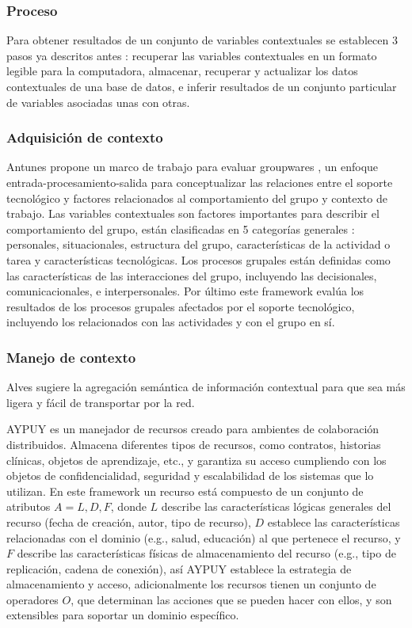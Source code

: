 \subsubsection{Proceso}
Para obtener resultados de un conjunto de variables contextuales se establecen 3 pasos ya descritos antes \cite{montane2013context}: recuperar las variables contextuales en un formato legible para la computadora, almacenar, recuperar y actualizar los datos contextuales de una base de datos, e inferir resultados de un conjunto particular de variables asociadas unas con otras.

\subsubsection {Adquisici\'on de contexto}
 Antunes propone un marco de trabajo para evaluar groupwares \cite{antunes2008structuring}, un enfoque entrada-procesamiento-salida para conceptualizar las relaciones entre el soporte tecnol\'ogico y factores relacionados al comportamiento del grupo y contexto de trabajo. Las variables contextuales son factores importantes para describir el comportamiento del grupo, est\'an clasificadas en 5 categor\'ias generales \cite{antunes2008structuring}: personales, situacionales, estructura del grupo, caracter\'isticas de la actividad o tarea y caracter\'isticas tecnol\'ogicas. Los procesos grupales est\'an definidas como las caracter\'isticas de las interacciones del grupo, incluyendo las decisionales, comunicacionales, e interpersonales. Por \'ultimo este framework eval\'ua los resultados de los procesos grupales afectados por el soporte tecnol\'ogico, incluyendo los relacionados con las actividades y con el grupo en s\'i.

\subsubsection {Manejo de contexto}
Alves \cite{alves2013radiator} sugiere la agregaci\'on sem\'antica de informaci\'on contextual para que sea m\'as ligera y f\'acil de transportar por la red.

AYPUY es un manejador de recursos creado para ambientes de colaboraci\'on distribuidos.  Almacena diferentes tipos de recursos, como contratos, historias cl\'inicas, objetos de aprendizaje, etc., y garantiza su acceso cumpliendo con los objetos de confidencialidad, seguridad y escalabilidad de los sistemas que lo utilizan. En este framework un recurso est\'a compuesto de un conjunto de atributos $A = { L, D, F }$, donde $L$ describe las caracter\'isticas l\'ogicas generales del recurso (fecha de creaci\'on, autor, tipo de recurso), $D$ establece las caracter\'isticas relacionadas con el dominio (e.g., salud, educaci\'on) al que pertenece el recurso, y $F$ describe las caracter\'isticas f\'isicas de almacenamiento del recurso (e.g., tipo de replicaci\'on, cadena de conexi\'on), as\'i AYPUY establece la estrategia de almacenamiento y acceso, adicionalmente los recursos tienen un conjunto de operadores $O$, que determinan las acciones que se pueden hacer con ellos, y son extensibles para soportar un dominio espec\'ifico.

